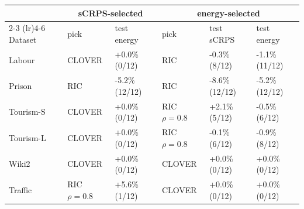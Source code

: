 \begin{tabular}{llllll}
\toprule
 & \multicolumn{2}{c}{sCRPS-selected} & \multicolumn{3}{c}{energy-selected} \\
\cmidrule(lr){2-3} \cmidrule(lr){4-6}
Dataset & pick & test energy & pick & test sCRPS & test energy \\
\midrule
Labour & CLOVER & +0.0\% (0/12) & RIC & -0.3\% (8/12) & -1.1\% (11/12) \\
Prison & RIC & -5.2\% (12/12) & RIC & -8.6\% (12/12) & -5.2\% (12/12) \\
Tourism-S & CLOVER & +0.0\% (0/12) & RIC $\rho{=}0.8$ & +2.1\% (5/12) & -0.5\% (6/12) \\
Tourism-L & CLOVER & +0.0\% (0/12) & RIC $\rho{=}0.8$ & -0.1\% (6/12) & -0.9\% (8/12) \\
Wiki2 & CLOVER & +0.0\% (0/12) & CLOVER & +0.0\% (0/12) & +0.0\% (0/12) \\
Traffic & RIC $\rho{=}0.8$ & +5.6\% (1/12) & CLOVER & +0.0\% (0/12) & +0.0\% (0/12) \\
\bottomrule
\end{tabular}
